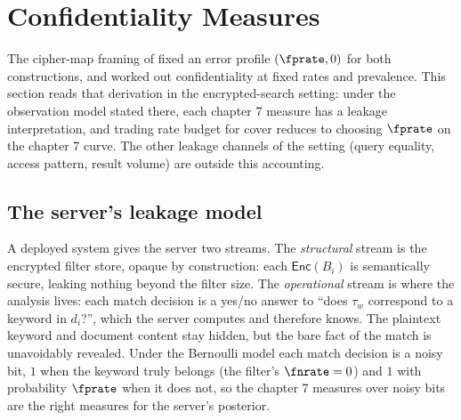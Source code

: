 %

\section{Confidentiality Measures}
\label{sec:confidentiality-measures}

The cipher-map framing of  fixed an error profile
$(\fprate, 0)$ for both constructions, and
 worked out confidentiality at fixed
rates and prevalence. This section reads that derivation in the
encrypted-search setting: under the observation model stated there, each
chapter 7 measure has a leakage interpretation, and trading rate budget
for cover reduces to choosing $\fprate$ on the chapter 7 curve. The other
leakage channels of the setting (query equality, access pattern, result
volume) are outside this accounting.

\subsection*{The server's leakage model}

A deployed system gives the server two streams. The \emph{structural}
stream is the encrypted filter store, opaque by construction: each
$\mathsf{Enc}(B_i)$ is semantically secure, leaking nothing beyond the
filter size. The \emph{operational} stream is where the analysis lives:
each match decision is a yes/no answer to ``does $\tau_w$ correspond to a
keyword in $d_i$?'', which the server computes and therefore knows. The
plaintext keyword and document content stay hidden, but the bare fact of
the match is unavoidably revealed. Under the Bernoulli model each match
decision is a noisy bit, $1$ when the keyword truly belongs (the filter's
$\fnrate = 0$) and $1$ with probability $\fprate$ when it does not, so the
chapter 7 measures over noisy bits are the right measures for the server's
posterior.

